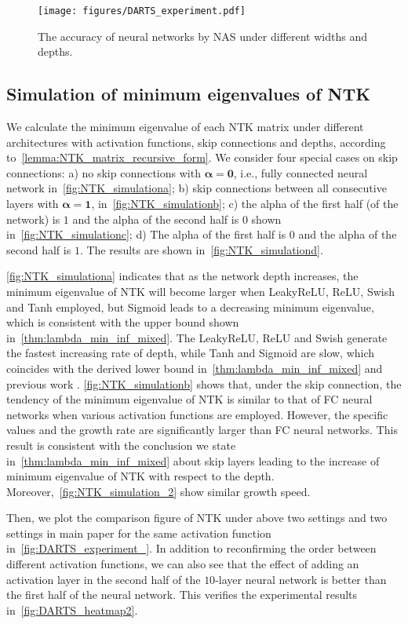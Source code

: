 \documentclass[nohyperref]{article}
\theoremstyle{plain}
\theoremstyle{definition}
\theoremstyle{remark}
\begin{document}
\begin{figure}[t]
\centering
    \texttt{[image: figures/DARTS\_experiment.pdf]}\vspace{-5mm}
\caption{The accuracy of neural networks by NAS under different widths and depths.}
\label{fig:DARTS_experiment}
\end{figure}

\subsection{Simulation of minimum eigenvalues of NTK}
\label{ssec:Simulation_of_NTK}

We calculate the minimum eigenvalue of each NTK matrix under different architectures with activation functions, skip connections and depths, according to~\cref{lemma:NTK_matrix_recursive_form}. 
We consider four special cases on skip connections: a) no skip connections with $\bm \alpha = \bm 0$, i.e., fully connected neural network in~\cref{fig:NTK_simulationa}; b) skip connections between all consecutive layers with $\bm \alpha = \bm 1$,  in~\cref{fig:NTK_simulationb}; c) the alpha of the first half (of the network) is $1$ and the alpha of the second half is $0$ shown in~\cref{fig:NTK_simulationc}; d) The alpha of the first half is $0$ and the alpha of the second half is $1$. The results are shown in~\cref{fig:NTK_simulationd}.

\cref{fig:NTK_simulationa} indicates that as the network depth increases, the minimum eigenvalue of NTK will become larger when LeakyReLU, ReLU, Swish and Tanh employed, but Sigmoid leads to a decreasing minimum eigenvalue, which is consistent with the upper bound shown in~\cref{thm:lambda_min_inf_mixed}. 
The LeakyReLU, ReLU and Swish generate the fastest increasing rate of depth, while Tanh and Sigmoid are slow, which coincides with the derived lower bound in~\cref{thm:lambda_min_inf_mixed} and previous work \cite{bachspaper}. \cref{fig:NTK_simulationb} shows that, under the skip connection, the tendency of the minimum eigenvalue of NTK is similar to that of FC neural networks when various activation functions are employed. However, the specific values and the growth rate are significantly larger than FC neural networks.
This result is consistent with the conclusion we state in~\cref{thm:lambda_min_inf_mixed} about skip layers leading to the increase of minimum eigenvalue of NTK with respect to the depth. Moreover,~\cref{fig:NTK_simulation_2} show similar growth speed.

Then, we plot the comparison figure of NTK under above two settings and two settings in main paper for the same activation function in~\cref{fig:DARTS_experiment_}. In addition to reconfirming the order between different activation functions, we can also see that the effect of adding an activation layer in the second half of the $10$-layer neural network is better than the first half of the neural network. This verifies the experimental results in~\cref{fig:DARTS_heatmap2}.
\end{document}
